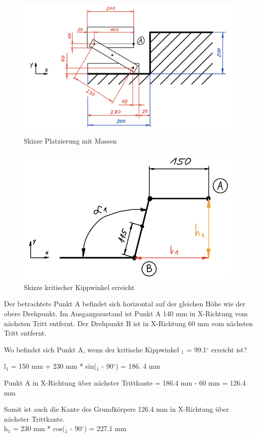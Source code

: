 \begin{figure}[H]
  \includegraphics[width=0.8
  \textwidth]{img/Treppensteigen/Skizze Platzierung}
  \centering
  \caption{Skizze Platzierung mit Massen}
\end{figure}

\begin{figure}[H]
  \includegraphics[width=0.6
  \textwidth]{img/Treppensteigen/Analyse 1.png}
  \centering
  \caption{Skizze kritischer Kippwinkel erreicht}
\end{figure}

Der betrachtete Punkt A befindet sich horizontal auf der gleichen Höhe wie der obere Drehpunkt. Im Ausgangszustand ist Punkt A 140 mm in X-Richtung vom nächsten Tritt entfernt. Der Drehpunkt B ist in X-Richtung 60 mm vom nächsten Tritt entfernt.

Wo befindet sich Punkt A, wenn der kritische Kippwinkel \alpha$_{1}$ = 99.1$^\circ$ erreicht ist?

l$_{1}$ = 150 mm + 230 mm * sin(\alpha$_{1}$ - 90$^\circ$) = 186. 4 mm

Punkt A in X-Richtung über nächster Trittkante = 186.4 mm - 60 mm = 126.4 mm

Somit ist auch die Kante des Grundkörpers 126.4 mm in X-Richtung über nächster Trittkante.\\

h$_{1}$ = 230 mm * cos(\alpha$_{1}$ - 90$^\circ$) = 227.1 mm

